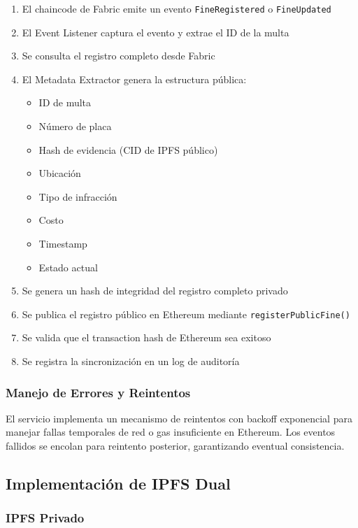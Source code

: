 \begin{enumerate}
    \item El chaincode de Fabric emite un evento \texttt{FineRegistered} o \texttt{FineUpdated}
    \item El Event Listener captura el evento y extrae el ID de la multa
    \item Se consulta el registro completo desde Fabric
    \item El Metadata Extractor genera la estructura pública:
    \begin{itemize}
        \item ID de multa
        \item Número de placa
        \item Hash de evidencia (CID de IPFS público)
        \item Ubicación
        \item Tipo de infracción
        \item Costo
        \item Timestamp
        \item Estado actual
    \end{itemize}
    \item Se genera un hash de integridad del registro completo privado
    \item Se publica el registro público en Ethereum mediante \texttt{registerPublicFine()}
    \item Se valida que el transaction hash de Ethereum sea exitoso
    \item Se registra la sincronización en un log de auditoría
\end{enumerate}

\subsubsection{Manejo de Errores y Reintentos}

El servicio implementa un mecanismo de reintentos con backoff exponencial para manejar fallas temporales de red o gas insuficiente en Ethereum. Los eventos fallidos se encolan para reintento posterior, garantizando eventual consistencia.

\subsection{Implementación de IPFS Dual}

\subsubsection{IPFS Privado}

